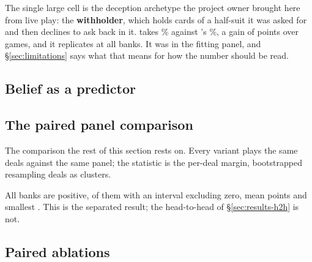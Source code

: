 The single large cell is the deception archetype the project owner brought here from live play: the
\textbf{withholder}, which holds cards of a half-suit it was asked for and then declines to ask
back in it. \vsix{} takes \vsixPoolWithholderSix\% against \vfive{}'s
\vsixPoolWithholderFive\%, a gain of \vsixPoolWithholderGain{} points over
\vsixPoolWithholderN{} games, and it replicates at all \vsixPoolBanks{} banks. It was in the
fitting panel, and \S\ref{sec:limitations} says what that means for how the number should be read.

\subsection{Belief as a predictor}
\label{sec:results-belief}

\begin{table}[t]\centering
\caption{Each posterior scored as a predictor on identical states: mean predictive log loss over the
unresolved cards, and the realised hit rate of that posterior's own argmax ask. The exact posterior
is the worst row.}
\label{tab:belief-results}

\end{table}

\subsection{The paired panel comparison}
\label{sec:results-paired}

The comparison the rest of this section rests on. Every variant plays the same deals against the
same panel; the statistic is the per-deal margin, bootstrapped resampling deals as clusters.

\begin{table}[t]\centering
\caption{\vsix{} against \vfive{} over a seven-opponent panel, 800--1{,}000 games per cell, on
\vsixPairedBanks{} disjoint seed banks. A positive margin means \vsix{} is ahead.}
\label{tab:pairedpanel}

\end{table}

All \vsixPairedBanks{} banks are positive, \vsixPairedExcl{} of them with an interval excluding
zero, mean \vsixPairedMean{} points and smallest \vsixPairedMin{}. This is the separated result;
the head-to-head of \S\ref{sec:results-h2h} is not.

\subsection{Paired ablations}
\label{sec:results-ablations}

